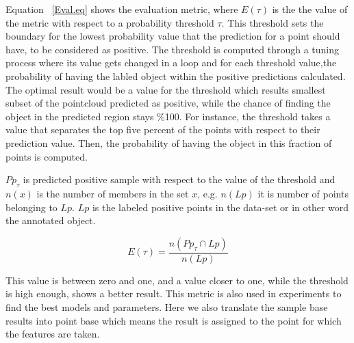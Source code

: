 Equation ~\ref{Eval.eq} shows the evaluation metric, where $E(\tau)$ is the the value of the metric with respect to a 
probability threshold $\tau$. 
This threshold sets the boundary for the lowest probability value that the prediction for a point should have, to be 
considered as positive. 
The threshold is computed through a tuning process where its value gets changed in a loop and for each threshold value,the probability of having the labled object within the positive predictions calculated. The optimal result would be a value for the threshold which results smallest subset of the pointcloud predicted as positive, while the chance of finding the object in the predicted region stays \%100. For instance, the threshold takes a value that separates the top five percent of the points with respect to their prediction value. Then, the probability of having the object in this fraction of points is computed.


$Pp_{\tau}$ is predicted positive sample with respect to the value of the threshold and $n(x)$ is the number of 
members in the set $x$, e.g. $n(Lp)$ it is number of points belonging to $Lp$. $Lp$ is the 
labeled positive points in the data-set or in other word the annotated object.

\begin{equation}
 \label{Eval.eq}
    E(\tau) = \frac{n({Pp_{\tau}} \cap {Lp})}{n(Lp)} 
\end{equation}

This value is between zero and one, and a value closer to one, while the threshold is high enough, shows a better result.
This metric is also used in experiments to find the best models and parameters. 
Here we also translate the sample base results into point base which means the result is assigned to the point for which 
the features are taken.




